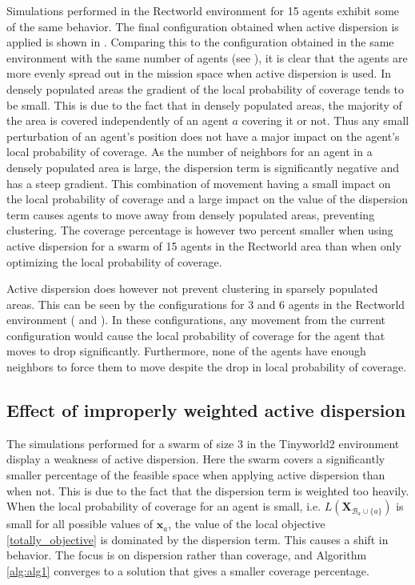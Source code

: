 Simulations performed in the Rectworld environment for 15 agents exhibit some of the same behavior. The final configuration obtained when active dispersion
is applied is shown in . Comparing this to the configuration obtained in the same environment with the same number of agents (see ), 
it is clear that the agents are more evenly spread out in the mission space when active dispersion is used. In densely populated areas the gradient of the local probability of coverage tends to be small. This is due to the fact that in densely populated areas, 
the majority of the area is covered independently of an agent $a$ covering it or not. Thus any small perturbation of an agent's position does not have a major impact on
the agent's local probability of coverage. As the number of neighbors for an agent in a densely populated area is large, the dispersion term is significantly negative and has a steep gradient.
This combination of movement having a small impact on the local probability of coverage and a large impact on the value of the dispersion term causes agents to move away from densely populated areas, 
preventing clustering. The coverage percentage is however two percent smaller when using active dispersion for a swarm of 15 agents in the Rectworld area than when only optimizing the local probability of coverage.

Active dispersion does however not prevent clustering in sparsely populated areas. This can be seen by the configurations for 3 and 6 agents in the
Rectworld environment ( and ). In these configurations, any
movement from the current configuration would cause the local
probability of coverage for the agent that moves to drop significantly. Furthermore, none of the agents have enough neighbors to force them to move despite
the drop in local probability of coverage.

\subsection{Effect of improperly weighted active dispersion}\label{secc:improp_weight_disc}
The simulations performed for a swarm of size 3 in the Tinyworld2 environment display a weakness of active dispersion. Here the swarm covers a significantly smaller percentage of the 
feasible space when applying active dispersion than when not. This is due to the fact that the dispersion term is weighted too heavily. When the local probability of coverage for an agent is small, i.e. $L(\mathbf{X}_{\mathcal{B}_{a}\cup\{a\}})$ is small 
for all possible values of $\mathbf{x}_{a}$, the value of 
the local objective \eqref{totally_objective} is dominated by the dispersion term. This causes a shift in behavior. The focus is on dispersion rather than coverage, and Algorithm \ref{alg:alg1} converges
to a solution that gives a smaller coverage percentage.

